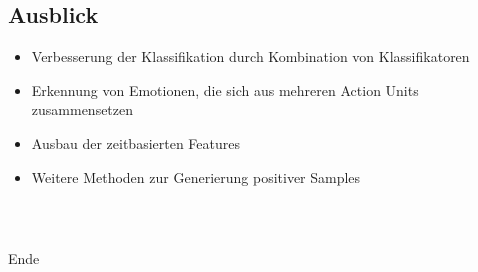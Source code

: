 \documentclass{beamer}
\begin{document}
\subsection{Ausblick}
\begin{frame}
  \begin{itemize}
    \item Verbesserung der Klassifikation durch Kombination von Klassifikatoren
    \item Erkennung von Emotionen, die sich aus mehreren Action Units zusammensetzen
    \item Ausbau der zeitbasierten Features
    \item Weitere Methoden zur Generierung positiver Samples
  \end{itemize}
\end{frame}

\begin{frame}[c]
  \frametitle{~}
  \begin{center}
    \Huge Ende
  \end{center}
\end{frame}
\end{document}
